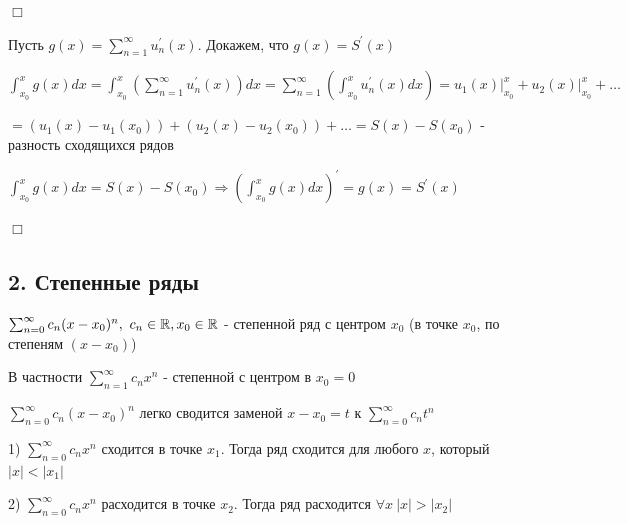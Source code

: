 \documentclass[12pt]{article}
\begin{document}
    
    \begin{MyProof}
        $\Box$

        Пусть $g(x) = \sum_{n = 1}^\infty u^\prime_n(x)$. Докажем, что $g(x) = S^\prime(x)$

        $\int_{x_0}^x g(x)dx = \int_{x_0}^x \left(\sum_{n = 1}^\infty u^\prime_n(x)\right) dx = \sum_{n = 1}^\infty 
        \left(\int_{x_0}^x u_n^\prime (x)dx\right) = u_1(x) \Big|_{x_0}^x + u_2(x) \Big|_{x_0}^x + \dots$

        $ = (u_1(x) - u_1(x_0)) + (u_2(x) - u_2(x_0)) + \dots = S(x) - S(x_0)$ - разность сходящихся рядов

        $\int_{x_0}^x g(x) dx = S(x) - S(x_0) \Longrightarrow \left(\int_{x_0}^x g(x) dx\right)^\prime = g(x) = S^\prime(x)$

        $\Box$
    \end{MyProof}

    \subsection{2. Степенные ряды}

    \Def $\sum_{n = 0}^\infty c_n(x - x_0)^n, \ c_n \in \mathbb{R}, x_0 \in \mathbb{R}$ - степенной ряд с центром $x_0$ (в точке $x_0$, по степеням $(x - x_0)$)

    \Nota В частности $\sum_{n = 1}^\infty c_n x^n$ - степенной с центром в $x_0 = 0$

    $\sum_{n = 0}^\infty c_n(x - x_0)^n$ легко сводится заменой $x - x_0 = t$ к $\sum_{n = 0}^\infty c_n t^n$

    \begin{MyTheorem}

        1) $\sum_{n = 0}^\infty c_n x^n$ сходится в точке $x_1$. Тогда ряд сходится для любого $x$, который $|x| < |x_1|$

        2) $\sum_{n = 0}^\infty c_n x^n$ расходится в точке $x_2$. Тогда ряд расходится $\forall x \ |x| > |x_2|$
    \end{MyTheorem}
\end{document}
